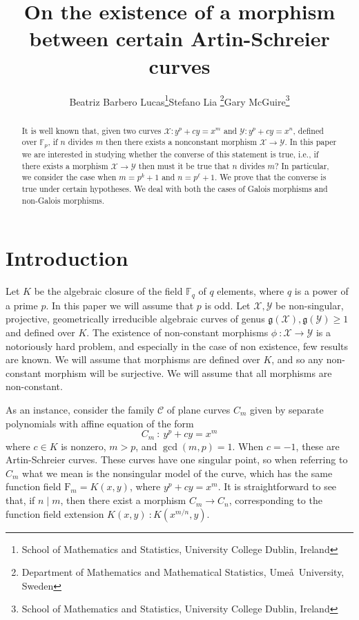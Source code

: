 \documentclass[oneside,a4paper,12pt]{article}
\title{On the existence of a morphism between certain 
Artin-Schreier curves}
\author{Beatriz Barbero Lucas\thanks{School of Mathematics and Statistics, University College Dublin, Ireland}\quad Stefano Lia \thanks{Department of Mathematics and Mathematical Statistics, Ume\aa~University, Sweden}\quad Gary McGuire\thanks{School of Mathematics and Statistics, University College Dublin, Ireland}}
\date{}
\newcommand{\F}{{\mathbb{F}}}
\theoremstyle{plain} %
\theoremstyle{definition} %
\begin{document}
\baselineskip18pt
\parskip15pt
\parindent0pt

\maketitle

\begin{abstract}
    It is well known that, given  two  
    curves  $\mathcal{X}: y^p+cy=x^m$ and $\mathcal{Y}:y^p+cy=x^n$, 
    defined over $\F_p$, if $n$ divides $m$ then there exists a nonconstant morphism 
    $\mathcal{X} \longrightarrow \mathcal{Y}$. In this paper we are interested in studying whether the converse of this statement is true, i.e., if there exists a morphism $\mathcal{X} \longrightarrow \mathcal{Y}$ then must it be true that $n$ divides $m$? In particular, we consider the case when $m=p^{k}+1$ and $n=p^\ell+1$. We prove that the converse is true 
under certain hypotheses. We deal with both the cases of Galois morphisms
and non-Galois morphisms.

    
\end{abstract}



\section{Introduction}

Let $K$ be the algebraic closure of the field $\mathbb{F}_q$ of $q$ elements, where $q$ is a power of a prime $p$.
In this paper we will assume that $p$ is odd.
Let $\mathcal{X}, \mathcal{Y}$ be non-singular, projective, geometrically irreducible algebraic curves of genus $\mathfrak{g}(\mathcal{X}),\mathfrak{g}(\mathcal{Y})\geq 1$ and defined over $K$.
The existence  of non-constant  morphisms 
$\phi~\colon \mathcal{X}\longrightarrow \mathcal{Y}$ is a notoriously hard problem, and especially in the case of non existence, few results are known.
We  will assume that morphisms are defined over $K$, and so any 
non-constant morphism will be surjective.
We will assume that all morphisms are non-constant.



As an instance, consider the family $\mathcal{C}$ 
of plane curves $C_m$ given by separate polynomials
with affine equation of the form
\[
C_m~\colon~y^p+c y=x^m
\]
where $c \in K$ is nonzero, $m>p$, and $\gcd(m,p)=1$. 
When $c=-1$, these are Artin-Schreier curves.
These curves have one singular point, so when
referring to $C_m$ what we  mean is the nonsingular model of the curve,
which has the same function field $\mathrm{F}_m=K(x,y)$, where $y^p+c y=x^m$.
It is straightforward to see that, if $n\mid m$, then there exist a morphism 
$C_m\longrightarrow C_n$, corresponding to the function field 
extension $K(x,y)~:K(x^{m/n},y)$.
\end{document}

